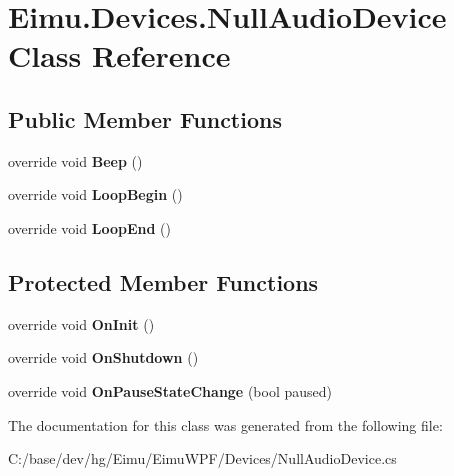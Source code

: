 \hypertarget{class_eimu_1_1_devices_1_1_null_audio_device}{
\section{Eimu.Devices.NullAudioDevice Class Reference}
\label{class_eimu_1_1_devices_1_1_null_audio_device}
}
\subsection*{Public Member Functions}
\begin{DoxyCompactItemize}
\item 
\hypertarget{class_eimu_1_1_devices_1_1_null_audio_device_a9393a3a1f846f2f2a292d171556a5da4}{
override void {\bfseries Beep} ()}
\label{class_eimu_1_1_devices_1_1_null_audio_device_a9393a3a1f846f2f2a292d171556a5da4}

\item 
\hypertarget{class_eimu_1_1_devices_1_1_null_audio_device_aad6598c1d94b7731bf6645c02cf49d21}{
override void {\bfseries LoopBegin} ()}
\label{class_eimu_1_1_devices_1_1_null_audio_device_aad6598c1d94b7731bf6645c02cf49d21}

\item 
\hypertarget{class_eimu_1_1_devices_1_1_null_audio_device_a5d11af7a1e07bc03343b4214944d9b95}{
override void {\bfseries LoopEnd} ()}
\label{class_eimu_1_1_devices_1_1_null_audio_device_a5d11af7a1e07bc03343b4214944d9b95}

\end{DoxyCompactItemize}
\subsection*{Protected Member Functions}
\begin{DoxyCompactItemize}
\item 
\hypertarget{class_eimu_1_1_devices_1_1_null_audio_device_a1b984e302c0353fd7f0a3c8a31f60229}{
override void {\bfseries OnInit} ()}
\label{class_eimu_1_1_devices_1_1_null_audio_device_a1b984e302c0353fd7f0a3c8a31f60229}

\item 
\hypertarget{class_eimu_1_1_devices_1_1_null_audio_device_ae590f41ecbd7069b62255c0bba0f716d}{
override void {\bfseries OnShutdown} ()}
\label{class_eimu_1_1_devices_1_1_null_audio_device_ae590f41ecbd7069b62255c0bba0f716d}

\item 
\hypertarget{class_eimu_1_1_devices_1_1_null_audio_device_a850d68590df5c430d32170968a57c59f}{
override void {\bfseries OnPauseStateChange} (bool paused)}
\label{class_eimu_1_1_devices_1_1_null_audio_device_a850d68590df5c430d32170968a57c59f}

\end{DoxyCompactItemize}


The documentation for this class was generated from the following file:\begin{DoxyCompactItemize}
\item 
C:/base/dev/hg/Eimu/EimuWPF/Devices/NullAudioDevice.cs\end{DoxyCompactItemize}
